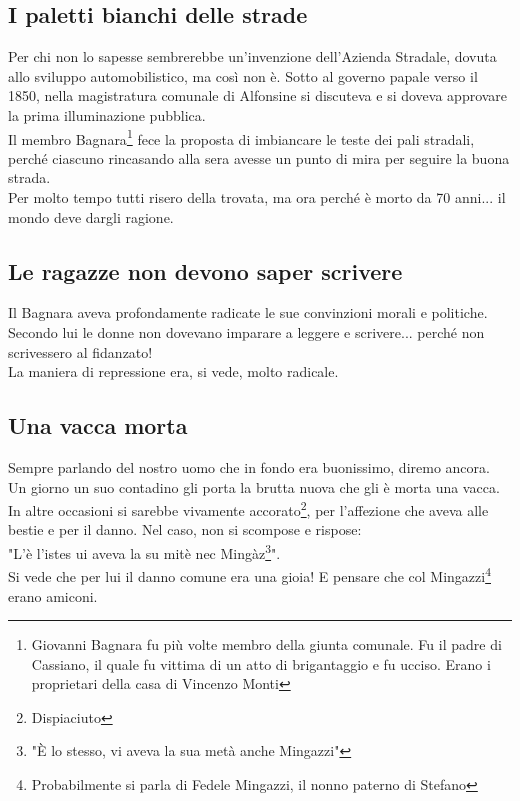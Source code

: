 \documentclass[10pt]{memoir} %
\begin{document}
\subsection{I paletti bianchi delle strade}
Per chi non lo sapesse sembrerebbe un'invenzione dell'Azienda Stradale, dovuta allo sviluppo automobilistico, ma così non è. Sotto al governo papale verso il 1850, nella magistratura comunale di Alfonsine si discuteva e si doveva approvare la prima illuminazione pubblica.\\
Il membro Bagnara\footnote{Giovanni Bagnara fu più volte membro della giunta comunale. Fu il padre di Cassiano, il quale fu vittima di un atto di brigantaggio e fu ucciso. Erano i proprietari della casa di Vincenzo Monti} fece la proposta di imbiancare le teste dei pali stradali, perché ciascuno rincasando alla sera avesse un punto di mira per seguire la buona strada.\\
Per molto tempo tutti risero della trovata, ma ora perché è morto da 70 anni... il mondo deve dargli ragione.

\subsection{Le ragazze non devono saper scrivere}
Il Bagnara aveva profondamente radicate le sue convinzioni morali e politiche.\\
Secondo lui le donne non dovevano imparare a leggere e scrivere... perché non scrivessero al fidanzato!\\
La maniera di repressione era, si vede, molto radicale.\\

\subsection{Una vacca morta}
Sempre parlando del nostro uomo che in fondo era buonissimo, diremo ancora.\\
Un giorno un suo contadino gli porta la brutta nuova che gli è morta una vacca. In altre occasioni si sarebbe vivamente accorato\footnote{Dispiaciuto}, per l'affezione che aveva alle bestie e per il danno. Nel caso, non si scompose e rispose:\\
"L'è l'istes ui aveva la su mitè nec Mingàz\footnote{"È lo stesso, vi aveva la sua metà anche Mingazzi"}". \\
Si vede che per lui il danno comune era una gioia! E pensare che col Mingazzi\footnote{Probabilmente si parla di Fedele Mingazzi, il nonno paterno di Stefano} erano amiconi.
\end{document}
